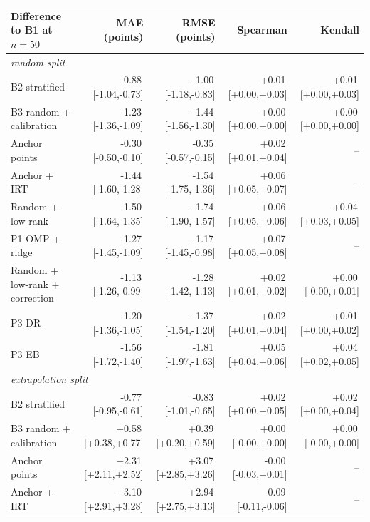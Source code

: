 {\scriptsize\setlength{\tabcolsep}{3pt}
\begin{tabular}{lrrrr}
\toprule
Difference to B1 at $n{=}50$ & MAE (points) & RMSE (points) & Spearman & Kendall \\
\midrule
\multicolumn{5}{l}{\emph{random split}} \\
B2 stratified & -0.88\,{\tiny[-1.04,-0.73]} & -1.00\,{\tiny[-1.18,-0.83]} & +0.01\,{\tiny[+0.00,+0.03]} & +0.01\,{\tiny[+0.00,+0.03]} \\
B3 random + calibration & -1.23\,{\tiny[-1.36,-1.09]} & -1.44\,{\tiny[-1.56,-1.30]} & +0.00\,{\tiny[+0.00,+0.00]} & +0.00\,{\tiny[+0.00,+0.00]} \\
Anchor points & -0.30\,{\tiny[-0.50,-0.10]} & -0.35\,{\tiny[-0.57,-0.15]} & +0.02\,{\tiny[+0.01,+0.04]} & -- \\
Anchor + IRT & -1.44\,{\tiny[-1.60,-1.28]} & -1.54\,{\tiny[-1.75,-1.36]} & +0.06\,{\tiny[+0.05,+0.07]} & -- \\
Random + low-rank & -1.50\,{\tiny[-1.64,-1.35]} & -1.74\,{\tiny[-1.90,-1.57]} & +0.06\,{\tiny[+0.05,+0.06]} & +0.04\,{\tiny[+0.03,+0.05]} \\
P1 OMP + ridge & -1.27\,{\tiny[-1.45,-1.09]} & -1.17\,{\tiny[-1.45,-0.98]} & +0.07\,{\tiny[+0.05,+0.08]} & -- \\
Random + low-rank + correction & -1.13\,{\tiny[-1.26,-0.99]} & -1.28\,{\tiny[-1.42,-1.13]} & +0.02\,{\tiny[+0.01,+0.02]} & +0.00\,{\tiny[-0.00,+0.01]} \\
P3 DR & -1.20\,{\tiny[-1.36,-1.05]} & -1.37\,{\tiny[-1.54,-1.20]} & +0.02\,{\tiny[+0.01,+0.04]} & +0.01\,{\tiny[+0.00,+0.02]} \\
P3 EB & -1.56\,{\tiny[-1.72,-1.40]} & -1.81\,{\tiny[-1.97,-1.63]} & +0.05\,{\tiny[+0.04,+0.06]} & +0.04\,{\tiny[+0.02,+0.05]} \\
\multicolumn{5}{l}{\emph{extrapolation split}} \\
B2 stratified & -0.77\,{\tiny[-0.95,-0.61]} & -0.83\,{\tiny[-1.01,-0.65]} & +0.02\,{\tiny[+0.00,+0.05]} & +0.02\,{\tiny[+0.00,+0.04]} \\
B3 random + calibration & +0.58\,{\tiny[+0.38,+0.77]} & +0.39\,{\tiny[+0.20,+0.59]} & +0.00\,{\tiny[-0.00,+0.00]} & +0.00\,{\tiny[-0.00,+0.00]} \\
Anchor points & +2.31\,{\tiny[+2.11,+2.52]} & +3.07\,{\tiny[+2.85,+3.26]} & -0.00\,{\tiny[-0.03,+0.01]} & -- \\
Anchor + IRT & +3.10\,{\tiny[+2.91,+3.28]} & +2.94\,{\tiny[+2.75,+3.13]} & -0.09\,{\tiny[-0.11,-0.06]} & -- \\

\end{tabular}}
